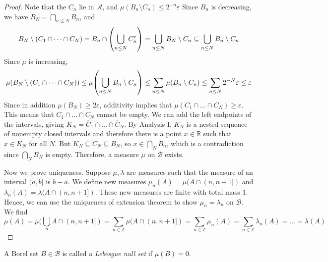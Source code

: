 \begin{proof}
	Note that the \( C_n \) lie in \( \mathcal A \), and \( \mu(B_n \setminus C_n) \leq 2^{-n}\varepsilon \)
	Since \( B_n \) is decreasing, we have \( B_N = \bigcap_{n \leq N} B_n \), and
	\[ B_N \setminus (C_1 \cap \dots \cap C_N) = B_n \cap \qty(\bigcup_{n \leq N} C_n^c) = \bigcup_{n \leq N} B_N \setminus C_n \subseteq \bigcup_{n \leq N} B_n \setminus C_n \]
	Since \( \mu \) is increasing,
	\[ \mu(B_N \setminus (C_1 \cap \dots \cap C_N)) \leq \mu\qty(\bigcup_{n \leq N} B_n \setminus C_n) \leq \sum_{n \leq N} \mu(B_n \setminus C_n) \leq \sum_{n \leq N} 2^{-N}\varepsilon \leq \varepsilon \]
	Since in addition \( \mu(B_N) \geq 2\varepsilon \), additivity implies that \( \mu(C_1 \cap \dots \cap C_N) \geq \varepsilon \).
	This means that \( C_1 \cap \dots \cap C_N \) cannot be empty.
	We can add the left endpoints of the intervals, giving \( K_N = \overline C_1 \cap \dots \cap \overline C_N \).
	By Analysis I, \( K_N \) is a nested sequence of nonempty closed intervals and therefore there is a point \( x \in \mathbb R \) such that \( x \in K_N \) for all \( N \).
	But \( K_N \subseteq \overline C_N \subseteq B_N \), so \( x \in \bigcap_N B_n \), which is a contradiction since \( \bigcap_N B_N \) is empty.
	Therefore, a measure \( \mu \) on \( \mathcal B \) exists.

	Now we prove uniqueness.
	Suppose \( \mu, \lambda \) are measures such that the measure of an interval \( (a,b] \) is \( b - a \).
	We define new measures \( \mu_n(A) = \mu(A \cap (n,n+1]) \) and \( \lambda_n(A) = \lambda(A \cap (n,n+1]) \).
	These new measures are finite with total mass 1.
	Hence, we can use the uniqueness of extension theorem to show \( \mu_n = \lambda_n \) on \( \mathcal B \).
	We find
	\[ \mu(A) = \mu(\bigcup_n A \cap (n,n+1]) = \sum_{n \in \mathbb Z} \mu(A \cap (n,n+1]) = \sum_{n \in \mathbb Z} \mu_n(A) = \sum_{n \in \mathbb Z} \lambda_n(A) = \dots = \lambda(A) \]
\end{proof}
\begin{definition}
	A Borel set \( B \in \mathcal B \) is called a \emph{Lebesgue null set} if \( \mu(B) = 0 \).
\end{definition}
